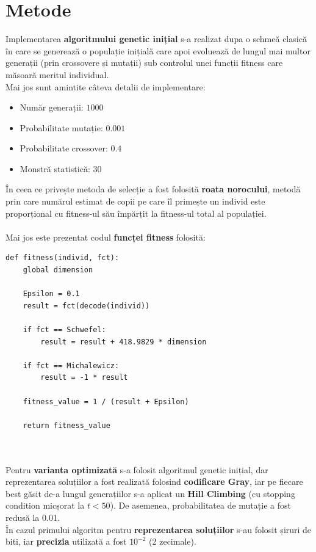 \documentclass{article}
\begin{document}
\section{Metode}
Implementarea \textbf{algoritmului genetic inițial} s-a realizat dupa o schmeă clasică în care se generează o populație inițială care apoi evoluează de lungul mai multor generații (prin crossovere și mutații) sub controlul unei funcții fitness care măsoară meritul individual.\\
Mai jos sunt amintite câteva detalii de implementare:
\begin{itemize}
\item Număr generații: $1000$
\item Probabilitate mutație: $0.001$
\item Probabilitate crossover: $0.4$
\item Monstră statistică: $30$
\end{itemize}
În ceea ce privește metoda de selecție a fost folosită \textbf{roata norocului}, metodă prin care numărul estimat de copii pe care îl primește un individ este proporțional cu fitness-ul său împărțit la fitness-ul total al populației.\\ \\
Mai jos este prezentat codul \textbf{funcței fitness} folosită: 
\begin{verbatim}
def fitness(individ, fct):
    global dimension

    Epsilon = 0.1
    result = fct(decode(individ))

    if fct == Schwefel:
        result = result + 418.9829 * dimension

    if fct == Michalewicz:
        result = -1 * result

    fitness_value = 1 / (result + Epsilon)

    return fitness_value
    
    
\end{verbatim}
Pentru \textbf{varianta optimizată} s-a folosit algoritmul genetic inițial, dar reprezentarea soluțiilor a fost realizată folosind \textbf{codificare Gray}, iar pe fiecare best găsit de-a lungul generațiilor s-a aplicat un \textbf{Hill Climbing} (cu stopping condition micșorat la $t < 50$). De asemenea, probabilitatea de mutație a fost redusă la 0.01.\\
În cazul primului algoritm pentru \textbf{reprezentarea soluțiilor} s-au folosit șiruri de biti, iar \textbf{precizia} utilizată a fost $10^{-2}$ (2 zecimale).
\clearpage
\end{document}
